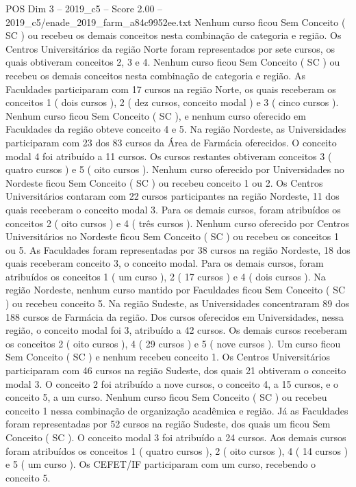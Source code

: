 \begin{textsample}{POS Dim 3 – 2019\_c5 – Score 2.00 – 2019\_c5/enade\_2019\_farm\_a84c9952ee.txt}
Nenhum curso ficou Sem Conceito ( SC ) ou recebeu os demais conceitos nesta combinação de categoria e região.
Os Centros Universitários da região Norte foram representados por sete cursos, os quais obtiveram conceitos 2, 3 e 4.
Nenhum curso ficou Sem Conceito ( SC ) ou recebeu os demais conceitos nesta combinação de categoria e região.
As Faculdades participaram com 17 cursos na região Norte, os quais receberam os conceitos 1 ( dois cursos ), 2 ( dez cursos, conceito modal ) e 3 ( cinco cursos ).
Nenhum curso ficou Sem Conceito ( SC ), e nenhum curso oferecido em Faculdades da região obteve conceito 4 e 5.
Na região Nordeste, as Universidades participaram com 23 dos 83 cursos da Área de Farmácia oferecidos.
O conceito modal 4 foi atribuído a 11 cursos.
Os cursos restantes obtiveram conceitos 3 ( quatro cursos ) e 5 ( oito cursos ).
Nenhum curso oferecido por Universidades no Nordeste ficou Sem Conceito ( SC ) ou recebeu conceito 1 ou 2.
Os Centros Universitários contaram com 22 cursos participantes na região Nordeste, 11 dos quais receberam o conceito modal 3.
Para os demais cursos, foram atribuídos os conceitos 2 ( oito cursos ) e 4 ( três cursos ).
Nenhum curso oferecido por Centros Universitários no Nordeste ficou Sem Conceito ( SC ) ou recebeu os conceitos 1 ou 5.
As Faculdades foram representadas por 38 cursos na região Nordeste, 18 dos quais receberam conceito 3, o conceito modal.
Para os demais cursos, foram atribuídos os conceitos 1 ( um curso ), 2 ( 17 cursos ) e 4 ( dois cursos ).
Na região Nordeste, nenhum curso mantido por Faculdades ficou Sem Conceito ( SC ) ou recebeu conceito 5.
Na região Sudeste, as Universidades concentraram 89 dos 188 cursos de Farmácia da região.
Dos cursos oferecidos em Universidades, nessa região, o conceito modal foi 3, atribuído a 42 cursos.
Os demais cursos receberam os conceitos 2 ( oito cursos ), 4 ( 29 cursos ) e 5 ( nove cursos ).
Um curso ficou Sem Conceito ( SC ) e nenhum recebeu conceito 1.
Os Centros Universitários participaram com 46 cursos na região Sudeste, dos quais 21 obtiveram o conceito modal 3.
O conceito 2 foi atribuído a nove cursos, o conceito 4, a 15 cursos, e o conceito 5, a um curso.
Nenhum curso ficou Sem Conceito ( SC ) ou recebeu conceito 1 nessa combinação de organização acadêmica e região.
Já as Faculdades foram representadas por 52 cursos na região Sudeste, dos quais um ficou Sem Conceito ( SC ).
O conceito modal 3 foi atribuído a 24 cursos.
Aos demais cursos foram atribuídos os conceitos 1 ( quatro cursos ), 2 ( oito cursos ), 4 ( 14 cursos ) e 5 ( um curso ).
Os CEFET/IF participaram com um curso, recebendo o conceito 5.

\end{textsample}
